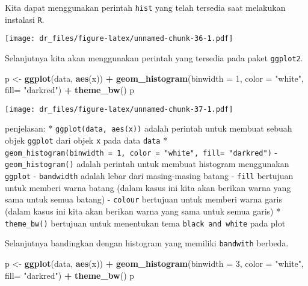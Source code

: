 \documentclass[
]{book}
\newenvironment{Shaded}{\begin{snugshade}}{\end{snugshade}}
\newcommand{\DataTypeTok}[1]{\textcolor[rgb]{0.13,0.29,0.53}{#1}}
\newcommand{\DecValTok}[1]{\textcolor[rgb]{0.00,0.00,0.81}{#1}}
\newcommand{\KeywordTok}[1]{\textcolor[rgb]{0.13,0.29,0.53}{\textbf{#1}}}
\newcommand{\NormalTok}[1]{#1}
\newcommand{\OperatorTok}[1]{\textcolor[rgb]{0.81,0.36,0.00}{\textbf{#1}}}
\newcommand{\StringTok}[1]{\textcolor[rgb]{0.31,0.60,0.02}{#1}}
\begin{document}
Kita dapat menggunakan perintah \texttt{hist} yang telah tersedia saat melakukan instalasi \texttt{R}.

\begin{Shaded}
\end{Shaded}

\texttt{[image: dr\_files/figure-latex/unnamed-chunk-36-1.pdf]}

Selanjutnya kita akan menggunakan perintah yang tersedia pada paket \texttt{ggplot2}.

\begin{Shaded}
\begin{Highlighting}[]
\NormalTok{p <-}\StringTok{ }\KeywordTok{ggplot}\NormalTok{(data, }\KeywordTok{aes}\NormalTok{(x)) }\OperatorTok{+}\StringTok{ }
\StringTok{  }\KeywordTok{geom_histogram}\NormalTok{(}\DataTypeTok{binwidth =} \DecValTok{1}\NormalTok{, }
                 \DataTypeTok{color =} \StringTok{"white"}\NormalTok{, }
                 \DataTypeTok{fill=} \StringTok{"darkred"}\NormalTok{) }\OperatorTok{+}
\StringTok{  }\KeywordTok{theme_bw}\NormalTok{()}
\NormalTok{p}
\end{Highlighting}
\end{Shaded}

\texttt{[image: dr\_files/figure-latex/unnamed-chunk-37-1.pdf]}

penjelasan:
* \texttt{ggplot(data,\ aes(x))} adalah perintah untuk membuat sebuah objek \texttt{ggplot} dari objek \texttt{x} pada data \texttt{data}
* \texttt{geom\_histogram(binwidth\ =\ 1,\ color\ =\ "white",\ fill=\ "darkred")}
- \texttt{geom\_histogram()} adalah perintah untuk membuat histogram menggunakan \texttt{ggplot}
- \texttt{bandwidth} adalah lebar dari masing-masing batang
- \texttt{fill} bertujuan untuk memberi warna batang (dalam kasus ini kita akan berikan warna yang sama untuk semua batang)
- \texttt{colour} bertujuan untuk memberi warna garis (dalam kasus ini kita akan berikan warna yang sama untuk semua garis)
* \texttt{theme\_bw()} bertujuan untuk menentukan tema \texttt{black\ and\ white} pada plot

Selanjutnya bandingkan dengan histogram yang memiliki \texttt{bandwith} berbeda.

\begin{Shaded}
\begin{Highlighting}[]
\NormalTok{p <-}\StringTok{ }\KeywordTok{ggplot}\NormalTok{(data, }\KeywordTok{aes}\NormalTok{(x)) }\OperatorTok{+}\StringTok{ }
\StringTok{  }\KeywordTok{geom_histogram}\NormalTok{(}\DataTypeTok{binwidth =} \DecValTok{3}\NormalTok{, }
                 \DataTypeTok{color =} \StringTok{"white"}\NormalTok{, }
                 \DataTypeTok{fill=} \StringTok{"darkred"}\NormalTok{) }\OperatorTok{+}
\StringTok{  }\KeywordTok{theme_bw}\NormalTok{()}
\NormalTok{p}
\end{Highlighting}
\end{Shaded}
\end{document}
